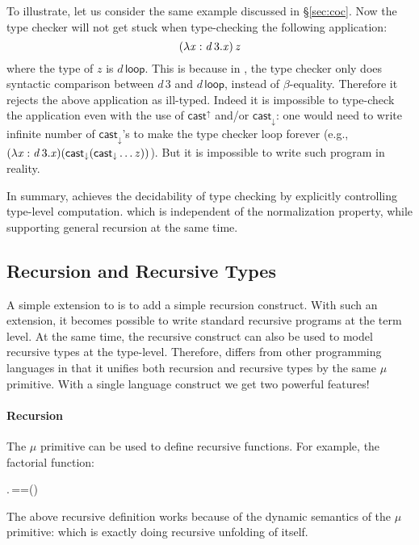To illustrate, let us consider the same example discussed in
\S\ref{sec:coc}. Now the type checker will not get stuck when
type-checking the following application:
\[ (  \lambda  \mathit{x}  :  \mathit{d} \, 3  .  \mathit{x}  ) \, \mathit{z} \]
where the type of $z$ is $d\,\mathsf{loop}$.  This is because in
\name, the type checker only does syntactic comparison between $d\,3$
and $d\,\mathsf{loop}$, instead of $\beta$-equality. Therefore it
rejects the above application as ill-typed. Indeed it is impossible to
type-check the application even with the use of $ \mathsf{cast}^{\uparrow} $ and/or
$ \mathsf{cast}_{\downarrow} $: one would need to write infinite number of
$ \mathsf{cast}_{\downarrow} $'s to make the type checker loop forever (e.g.,
$(\lambda  \mathit{x}  :  \mathit{d} \, 3  .  \mathit{x})( \mathsf{cast}_{\downarrow} ( \mathsf{cast}_{\downarrow}  \dots z))$). But it is
impossible to write such program in reality.

In summary, \name achieves the decidability of type checking by
explicitly controlling type-level computation.  which is independent
of the normalization property, while supporting general recursion at
the same time.

\subsection{Recursion and Recursive Types}


A simple extension to \name is to add a simple recursion construct.
With such an extension, it becomes possible to write standard
recursive programs at the term level. At the same time, the recursive
construct can also be used to model recursive types at the type-level.
Therefore, \name differs from other programming languages in that it
unifies both recursion and recursive types by the same $\mu$
primitive. With a single language construct we get two powerful
features!

\paragraph{Recursion}

The $\mu$ primitive can be used to define recursive functions.  For
example, the factorial function:
\begin{hscode}\SaveRestoreHook
{}%
%
%
\>[3]{}\mu\;\mathbin{:}\to {}.\,\;==\;\;\;\;\;\times\;\;(\mathbin{-}){}\<[E]%
\ColumnHook
\end{hscode}\resethooks
The above recursive definition works because of the dynamic semantics of the
$\mu$ primitive: \ottusedrule{\ottdruleSXXMu{}} which is exactly doing
recursive unfolding of itself.

